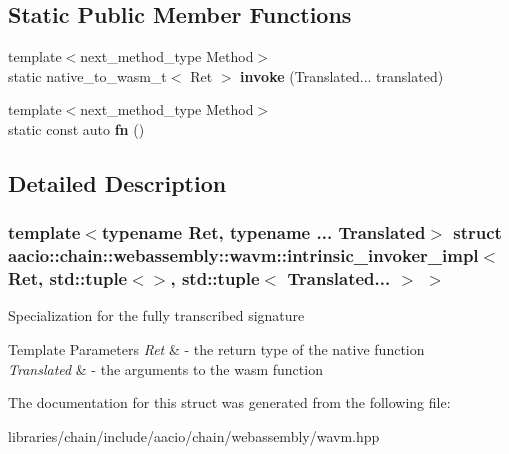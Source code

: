 \subsection*{Static Public Member Functions}
\begin{DoxyCompactItemize}
\item 
\mbox{\label{structaacio_1_1chain_1_1webassembly_1_1wavm_1_1intrinsic__invoker__impl_3_01_ret_00_01std_1_1tupc2f9a1e0a8d32bb22e7244f2be71510b_ae43e1b618c00f923272148dd203ad254}} 
{\footnotesize template$<$next\+\_\+method\+\_\+type Method$>$ }\\static native\+\_\+to\+\_\+wasm\+\_\+t$<$ Ret $>$ {\bfseries invoke} (Translated... translated)
\item 
\mbox{\label{structaacio_1_1chain_1_1webassembly_1_1wavm_1_1intrinsic__invoker__impl_3_01_ret_00_01std_1_1tupc2f9a1e0a8d32bb22e7244f2be71510b_a1aee2f04efc50324f2b82edee9668c24}} 
{\footnotesize template$<$next\+\_\+method\+\_\+type Method$>$ }\\static const auto {\bfseries fn} ()
\end{DoxyCompactItemize}


\subsection{Detailed Description}
\subsubsection*{template$<$typename Ret, typename ... Translated$>$\newline
struct aacio\+::chain\+::webassembly\+::wavm\+::intrinsic\+\_\+invoker\+\_\+impl$<$ Ret, std\+::tuple$<$$>$, std\+::tuple$<$ Translated... $>$ $>$}

Specialization for the fully transcribed signature 
\begin{DoxyTemplParams}{Template Parameters}
{\em Ret} & -\/ the return type of the native function \\
\hline
{\em Translated} & -\/ the arguments to the wasm function \\
\hline
\end{DoxyTemplParams}


The documentation for this struct was generated from the following file\+:\begin{DoxyCompactItemize}
\item 
libraries/chain/include/aacio/chain/webassembly/wavm.\+hpp\end{DoxyCompactItemize}
